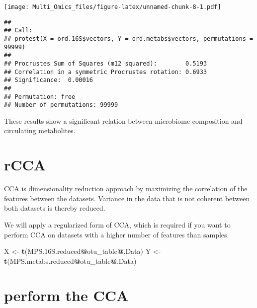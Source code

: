 \documentclass[
]{article}
\newenvironment{Shaded}{\begin{snugshade}}{\end{snugshade}}
\newcommand{\AttributeTok}[1]{\textcolor[rgb]{0.13,0.29,0.53}{#1}}
\newcommand{\DecValTok}[1]{\textcolor[rgb]{0.00,0.00,0.81}{#1}}
\newcommand{\FloatTok}[1]{\textcolor[rgb]{0.00,0.00,0.81}{#1}}
\newcommand{\FunctionTok}[1]{\textcolor[rgb]{0.13,0.29,0.53}{\textbf{#1}}}
\newcommand{\NormalTok}[1]{#1}
\newcommand{\OtherTok}[1]{\textcolor[rgb]{0.56,0.35,0.01}{#1}}
\newcommand{\SpecialCharTok}[1]{\textcolor[rgb]{0.81,0.36,0.00}{\textbf{#1}}}
\begin{document}
\texttt{[image: Multi\_Omics\_files/figure-latex/unnamed-chunk-8-1.pdf]}

\begin{Shaded}
\end{Shaded}

\begin{verbatim}
## 
## Call:
## protest(X = ord.16S$vectors, Y = ord.metabs$vectors, permutations = 99999) 
## 
## Procrustes Sum of Squares (m12 squared):        0.5193 
## Correlation in a symmetric Procrustes rotation: 0.6933 
## Significance:  0.00016 
## 
## Permutation: free
## Number of permutations: 99999
\end{verbatim}

These results show a significant relation between microbiome composition
and circulating metabolites.

\hypertarget{rcca}{%
\section{rCCA}\label{rcca}}

CCA is dimensionality reduction approach by maximizing the correlation
of the features between the datasets. Variance in the data that is not
coherent between both datasets is thereby reduced.

We will apply a regularized form of CCA, which is required if you want
to perform CCA on datasets with a higher number of features than
samples.

\begin{Shaded}
\begin{Highlighting}[]
\NormalTok{X }\OtherTok{\textless{}{-}} \FunctionTok{t}\NormalTok{(MPS}\FloatTok{.16}\NormalTok{S.reduced}\SpecialCharTok{@}\NormalTok{otu\_table}\SpecialCharTok{@}\NormalTok{.Data)}
\NormalTok{Y }\OtherTok{\textless{}{-}} \FunctionTok{t}\NormalTok{(MPS.metabs.reduced}\SpecialCharTok{@}\NormalTok{otu\_table}\SpecialCharTok{@}\NormalTok{.Data)}
\end{Highlighting}
\end{Shaded}

\hypertarget{perform-the-cca}{%
\section{perform the CCA}\label{perform-the-cca}}
\end{document}
